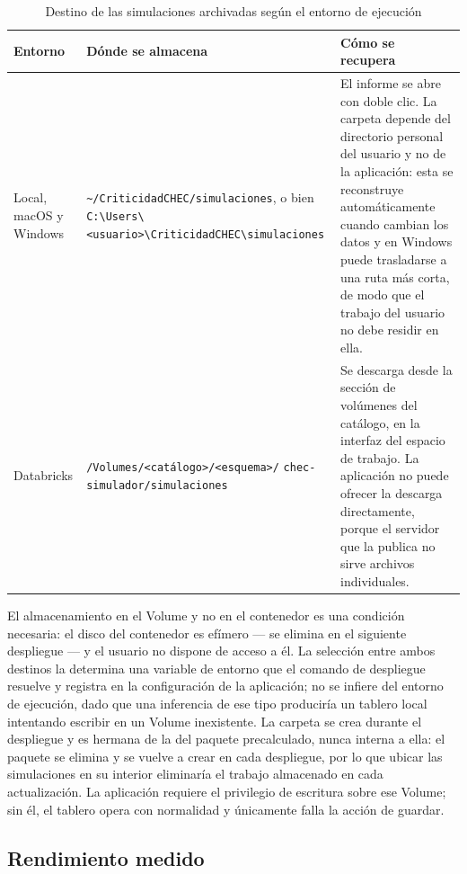 \documentclass[11pt,a4paper]{article}
\begin{document}
\begin{table}[H]
\centering
\caption{Destino de las simulaciones archivadas según el entorno de ejecución}
\label{tab:destinos}
\footnotesize
\begin{tabularx}{\textwidth}{L{2.4cm} L{5.4cm} X}
\toprule
\textbf{Entorno} & \textbf{Dónde se almacena} & \textbf{Cómo se recupera} \\
\midrule
Local, macOS y Windows &
\texttt{\textasciitilde/CriticidadCHEC/simulaciones}, o bien
\texttt{C:\textbackslash Users\textbackslash <usuario>\textbackslash}\-\texttt{CriticidadCHEC\textbackslash simulaciones} &
El informe se abre con doble clic. La carpeta depende del directorio personal del usuario y no
de la aplicación: esta se reconstruye automáticamente cuando cambian los datos y en Windows
puede trasladarse a una ruta más corta, de modo que el trabajo del usuario no debe residir en
ella. \\
\addlinespace
Databricks &
\texttt{/Volumes/<catálogo>/<esquema>/} \texttt{chec-simulador/simulaciones} &
Se descarga desde la sección de volúmenes del catálogo, en la interfaz del espacio de trabajo.
La aplicación no puede ofrecer la descarga directamente, porque el servidor que la publica no
sirve archivos individuales. \\
\bottomrule
\end{tabularx}
\end{table}

El almacenamiento en el Volume y no en el contenedor es una condición necesaria: el disco del
contenedor es efímero --- se elimina en el siguiente despliegue --- y el usuario no dispone de
acceso a él. La selección entre ambos destinos la determina una variable de entorno que el
comando de despliegue resuelve y registra en la configuración de la aplicación; no se infiere
del entorno de ejecución, dado que una inferencia de ese tipo produciría un tablero local
intentando escribir en un Volume inexistente. La carpeta se crea durante el despliegue y es
hermana de la del paquete precalculado, nunca interna a ella: el paquete se elimina y se vuelve
a crear en cada despliegue, por lo que ubicar las simulaciones en su interior eliminaría el
trabajo almacenado en cada actualización. La aplicación requiere el privilegio de escritura
sobre ese Volume; sin él, el tablero opera con normalidad y únicamente falla la acción de
guardar.

\subsection{Rendimiento medido}
\end{document}
